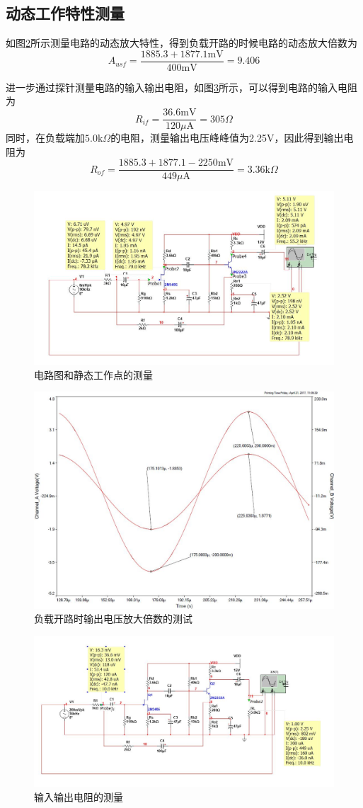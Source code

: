 \documentclass[UTF8,a4paper]{ctexart}
\begin{document}
\subsection{动态工作特性测量}
如图\ref{A2}所示测量电路的动态放大特性，得到负载开路的时候电路的动态放大倍数为$$A_{usf}=\frac{1885.3+1877.1\mathrm{mV}}{400\mathrm{mV}}=9.406$$

进一步通过探针测量电路的输入输出电阻，如图\ref{R2}所示，可以得到电路的输入电阻为
$$R_{if}=\frac{36.6\mathrm{mV}}{120\mu\mathrm{A}}=305\Omega$$
同时，在负载端加$5.0\mathrm{k}\Omega$的电阻，测量输出电压峰峰值为2.25V，因此得到输出电阻为
$$R_{of}=\frac{1885.3+1877.1-2250\mathrm{mV}}{449\mu\mathrm{A}}=3.36\mathrm{k}\Omega$$
\begin{figure}
\centering
\includegraphics[width=\textwidth]{Q2.jpg}
\caption{电路图和静态工作点的测量}
\label{Q2}
\end{figure}
\begin{figure}
\centering
\includegraphics[width=\textwidth]{A2.jpg}
\caption{负载开路时输出电压放大倍数的测试}
\label{A2}
\end{figure}
\begin{figure}
\centering
\includegraphics[width=\textwidth]{R2.jpg}
\caption{输入输出电阻的测量}
\label{R2}
\end{figure}
\end{document}
